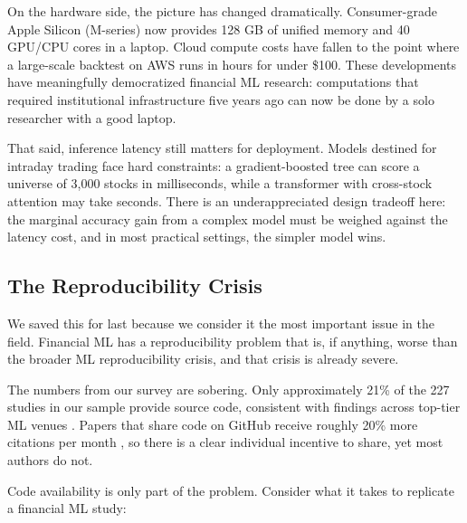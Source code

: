 On the hardware side, the picture has changed dramatically. Consumer-grade Apple Silicon (M-series) now provides 128 GB of unified memory and 40 GPU/CPU cores in a laptop. Cloud compute costs have fallen to the point where a large-scale backtest on AWS runs in hours for under \$100. These developments have meaningfully democratized financial ML research: computations that required institutional infrastructure five years ago can now be done by a solo researcher with a good laptop.

That said, inference latency still matters for deployment. Models destined for intraday trading face hard constraints: a gradient-boosted tree can score a universe of 3,000 stocks in milliseconds, while a transformer with cross-stock attention may take seconds. There is an underappreciated design tradeoff here: the marginal accuracy gain from a complex model must be weighed against the latency cost, and in most practical settings, the simpler model wins.

\subsection{The Reproducibility Crisis}

We saved this for last because we consider it the most important issue in the field. Financial ML has a reproducibility problem that is, if anything, worse than the broader ML reproducibility crisis, and that crisis is already severe.

The numbers from our survey are sobering. Only approximately 21\% of the 227 studies in our sample provide source code, consistent with findings across top-tier ML venues \citep{Pineau2021}. Papers that share code on GitHub receive roughly 20\% more citations per month \citep{Hasselbring2024}, so there is a clear individual incentive to share, yet most authors do not.

Code availability is only part of the problem. Consider what it takes to replicate a financial ML study:

